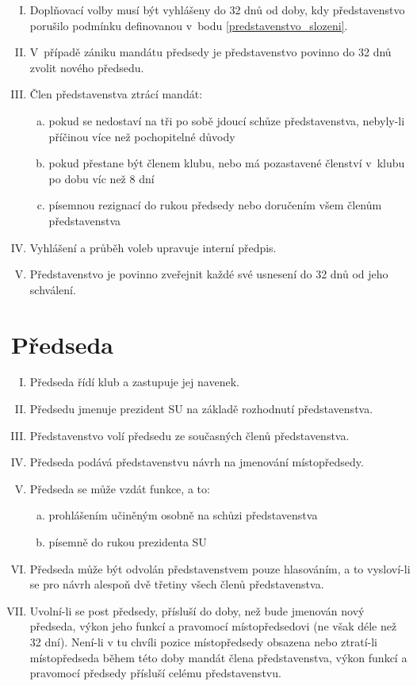 \documentclass[10pt]{article}
\begin{document}
\begin{enumerate}[I.]
	\item Doplňovací volby musí být vyhlášeny do 32 dnů od doby, kdy představenstvo porušilo podmínku definovanou v~bodu \ref{predstavenstvo_slozeni}.
	\item V~případě zániku mandátu předsedy je představenstvo povinno do 32 dnů zvolit nového předsedu.
	\item Člen představenstva ztrácí mandát:
		\begin{enumerate}[a.]
		\item pokud se nedostaví na tři po sobě jdoucí schůze představenstva, nebyly-li příčinou více než pochopitelné důvody
		\item pokud přestane být členem klubu, nebo má pozastavené členství v~klubu po dobu víc než 8 dní
		\item písemnou rezignací do rukou předsedy nebo doručením všem členům představenstva
		\end{enumerate}
	\item Vyhlášení a průběh voleb upravuje interní předpis. 
	\item Představenstvo je povinno zveřejnit každé své usnesení do 32 dnů od jeho schválení.
	\end{enumerate}

\section{Předseda} %
	\begin{enumerate}[I.]
	\item Předseda řídí klub a zastupuje jej navenek.  
	\item Předsedu jmenuje prezident SU na základě rozhodnutí představenstva.
	\item Představenstvo volí předsedu ze současných členů představenstva.
	\item Předseda podává představenstvu návrh na jmenování místopředsedy.
	\item Předseda se může vzdát funkce, a to:  
		\begin{enumerate}[a.]
		\item prohlášením učiněným osobně na schůzi představenstva
		\item písemně do rukou prezidenta SU  
		\end{enumerate}
	\item Předseda může být odvolán představenstvem pouze hlasováním, a to vysloví-li se pro návrh alespoň dvě třetiny všech členů představenstva. 
	\item Uvolní-li se post předsedy, přísluší do doby, než bude jmenován nový předseda, výkon jeho funkcí a pravomocí místopředsedovi (ne však déle než 32 dní). Není-li v tu chvíli pozice místopředsedy obsazena nebo ztratí-li místopředseda během této doby mandát člena představenstva, výkon funkcí a pravomocí předsedy přísluší celému představenstvu.
	\end{enumerate}
\end{document}
